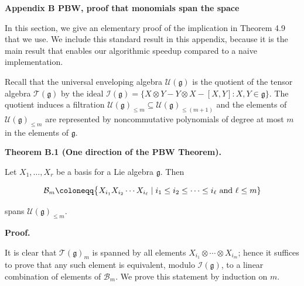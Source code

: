 

\par\medskip\noindent\textbf{Appendix B PBW, proof that monomials span the space}\par




In this section, we give an elementary proof of the implication in Theorem 4.9 that we use. We include this standard result in this appendix, because it is the main result that enables our algorithmic speedup compared to a naive implementation.





Recall that the universal enveloping algebra $\mathcal{U}(\mathfrak{g})$ is the quotient of the tensor algebra $\mathcal{T}(\mathfrak{g})$ by the ideal $\mathcal{I}(\mathfrak{g})=\{X\otimes Y-Y\otimes X-[X,Y]:X,Y\in\mathfrak{g}\}$. The quotient induces a filtration $\mathcal{U}(\mathfrak{g})_{\leq m}\subseteq\mathcal{U}(\mathfrak{g})_{\leq(m+1)}$ and the elements of $\mathcal{U}(\mathfrak{g})_{\leq m}$ are represented by noncommutative polynomials of degree at most $m$ in the elements of $\mathfrak{g}$.





\par\medskip\noindent\textbf{Theorem B.1 (One direction of the PBW Theorem).}\par



Let $X_{1},\ldots,X_{r}$ be a basis for a Lie algebra $\mathfrak{g}$. Then



\[\begin{aligned}
\displaystyle\mathcal{B}_{m}\coloneqq\big{\{}X_{i_{1}}X_{i_{2}}\cdots X_{i_{\ell}}\mid i_{1}\leq i_{2}\leq\cdots\leq i_{\ell}\text{ and }\ell\leq m\}
\end{aligned}\]


spans $\mathcal{U}(\mathfrak{g})_{\leq m}$.






\par\medskip\noindent\textbf{Proof.}\par




It is clear that $\mathcal{T}(\mathfrak{g})_{m}$ is spanned by all elements $X_{i_{1}}\otimes\cdots\otimes X_{i_{m}}$; hence it suffices to prove that any such element is equivalent, modulo $\mathcal{I}(\mathfrak{g})$, to a linear combination of elements of $\mathcal{B}_{m}$. We prove this statement by induction on $m$.





